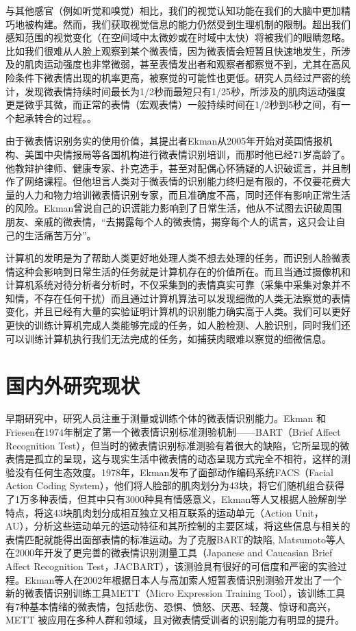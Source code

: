 与其他感官（例如听觉和嗅觉）相比，我们的视觉认知功能在我们的大脑中更加精巧地被构建。然而，我们获取视觉信息的能力仍然受到生理机制的限制。超出我们感知范围的视觉变化（在空间域中太微妙或在时域中太快）将被我们的眼睛忽略。比如我们很难从人脸上观察到某个微表情，因为微表情会短暂且快速地发生，所涉及的肌肉运动强度也非常微弱，甚至表情发出者和观察者都察觉不到，尤其在高风险条件下微表情出现的机率更高，被察觉的可能性也更低。研究人员经过严密的统计，发现微表情持续时间最长为1/2秒而最短只有1/25秒，所涉及的肌肉运动强度更是微乎其微，而正常的表情（宏观表情）一般持续时间在1/2秒到5秒之间，有一个起承转合的过程。\citep{Yan2013How, matsumoto2011evidence, Porter2008Reading}。

由于微表情识别务实的使用价值，其提出者Ekman从2005年开始对英国情报机构、美国中央情报局等各国机构进行微表情识别培训，而那时他已经71岁高龄了\citep{Lie2010to}。他教辩护律师、健康专家、扑克选手，甚至对配偶心怀猜疑的人识破谎言，并且制作了网络课程。但他坦言人类对于微表情的识别能力终归是有限的，不仅要花费大量的人力和物力培训微表情识别专家，而且准确度不高，同时还伴有影响正常生活的风险\citep{Ekman2010A}。Ekman曾说自己的识谎能力影响到了日常生活，他从不试图去识破周围朋友、亲戚的微表情，“去揭露每个人的微表情，揭穿每个人的谎言，这只会让自己的生活痛苦万分”。

计算机的发明是为了帮助人类更好地处理人类不想去处理的任务，而识别人脸微表情这种会影响到日常生活的任务就是计算机存在的价值所在。而且当通过摄像机和计算机系统对待分析者分析时，不仅采集到的表情真实可靠（采集中采集对象并不知情，不存在任何干扰）而且通过计算机算法可以发现细微的人类无法察觉的表情变化，并且已经有大量的实验证明计算机的识别能力确实高于人类\citep{Li2017Towards}。我们可以更好更快的训练计算机完成人类能够完成的任务，如人脸检测、人脸识别，同时我们还可以训练计算机执行我们无法完成的任务，如捕获肉眼难以察觉的细微信息\citep{Doctoral2017Li}。

\section{国内外研究现状}\label{sec:system}

早期研究中，研究人员注重于测量或训练个体的微表情识别能力。Ekman 和Friesen在1974年制定了第一个微表情识别标准测验机制——BART（Brief Affect Recognition Test），但当时的微表情识别标准测验有着很大的缺陷，它所呈现的微表情是孤立的呈现，这与现实生活中微表情的动态呈现方式完全不相符，这样的测验没有任何生态效度\citep{Ekman1974Detecting, 殷明2016微表情}。1978年，Ekman发布了面部动作编码系统FACS（Facial Action Coding System），他们将人脸部的肌肉划分为43块，将它们随机组合获得了1万多种表情，但其中只有3000种具有情感意义，Ekman等人又根据人脸解剖学特点，将这43块肌肉划分成相互独立又相互联系的运动单元（Action Unit，AU），分析这些运动单元的运动特征和其所控制的主要区域，将这些信息与相关的表情匹配就能得出面部表情的标准运动\citep{ekman1978facial}。为了克服BART的缺陷, Matsumoto等人在2000年开发了更完善的微表情识别测量工具（Japanese and Caucasian Brief Affect Recognition Test，JACBART），该测验具有很好的可信度和严密的实验过程\citep{Matsumoto2000A}。Ekman等人在2002年根据日本人与高加索人短暂表情识别测验开发出了一个新的微表情识别训练工具METT（Micro Expression Training Tool），该训练工具有7种基本情绪的微表情，包括悲伤、恐惧、愤怒、厌恶、轻蔑、惊讶和高兴，METT 被应用在多种人群和领域，且对微表情受训者的识别能力有明显的提升\citep{ekman2003mett}。

